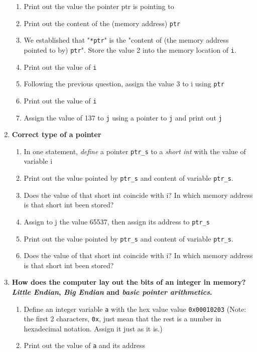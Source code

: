 \documentclass{article}
\begin{document}
\begin{enumerate}
\begin{enumerate}[label=\arabic*]
		\item Print out the value the pointer ptr is pointing to
		\item Print out the content of the (memory address) \texttt{ptr}
		\item We established that "\texttt{*ptr}" is the "content of (the memory address pointed to by) \texttt{ptr}". Store the value 2 into the memory location of \texttt{i}.
		\item Print out the value of \texttt{i}
		\item Following the previous question, assign the value 3 to i using \texttt{ptr}
		\item Print out the value of \texttt{i}
		\item Assign the value of 137 to \texttt{j} using a pointer to \texttt{j} and print out \texttt{j}
	\end{enumerate}
	\item \textbf{Correct type of a pointer}
    \begin{enumerate}[label=\arabic*]
		\item In one statement, \textit{define} a pointer \texttt{ptr\_s} to a \textit{short int} with the value of variable i
		\item Print out the value pointed by \texttt{ptr\_s} and content of variable \texttt{ptr\_s}. 
		\item Does the value of that short int coincide with i? In which memory address is that short int been stored?
		\item Assign to j the value 65537, then assign its address to \texttt{ptr\_s}
		\item Print out the value pointed by \texttt{ptr\_s} and content of variable \texttt{ptr\_s}. 
		\item Does the value of that short int coincide with i? In which memory address is that short int been stored?
	\end{enumerate}
	\item \textbf{How does the computer lay out the bits of an integer in memory? \textit{Little Endian}, \textit{Big Endian} and \textit{basic pointer arithmetics}. }
    \begin{enumerate}[label=\arabic*]
			\item Define an integer variable \texttt{a} with the hex value value  \texttt{0x00010203} (Note: the first 2 characters, \texttt{0x}, just mean that
					the rest is a number in hexadecimal notation. Assign it just as it is.)
			\item Print out the value of \texttt{a} and its address

\end{enumerate}
\end{enumerate}
\end{document}
